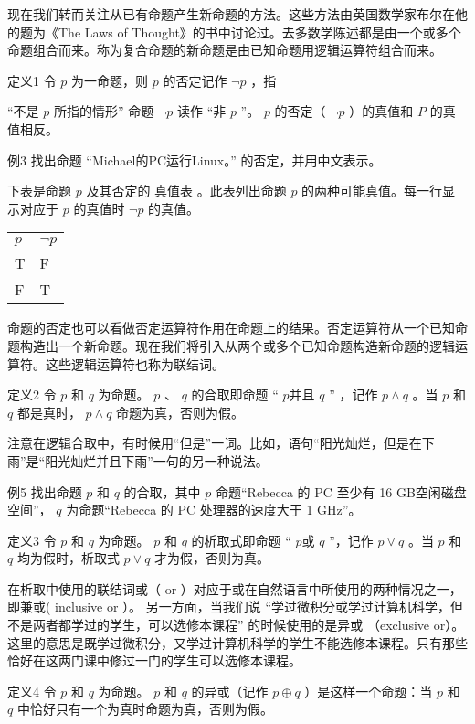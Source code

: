 现在我们转而关注从已有命题产生新命题的方法。这些方法由英国数学家布尔在他的题为《The Laws of Thought》的书中讨论过。去多数学陈述都是由一个或多个命题组合而来。称为复合命题的新命题是由已知命题用逻辑运算符组合而来。  

定义1  令
$p$
为一命题，则
$p$
的否定记作
$\neg p$
，指

	“不是
	$p$
	所指的情形”
命题
$\neg p$
读作 “非
$p$
”。
$p$
的否定（ 
$\neg p$
）的真值和
$P$
的真值相反。  

例3  找出命题
“Michael的PC运行Linux。” 
的否定，并用中文表示。

下表是命题
$p$
及其否定的 真值表 。此表列出命题
$p$
的两种可能真值。每一行显示对应于
$p$
的真值时
$\neg p$
的真值。  

\begin{table}[h]
	\centering
	\begin{tabular}{l|l}
		\hline
		$p$ & $\neg p$ \\
		\hline
		T & F	\\
		F & T \\
		\hline
	\end{tabular}
\end{table}
		

命题的否定也可以看做否定运算符作用在命题上的结果。否定运算符从一个已知命题构造出一个新命题。现在我们将引入从两个或多个已知命题构造新命题的逻辑运算符。这些逻辑运算符也称为联结词。

定义2  令
$p$
和
$q$
为命题。
$p$
、
$q$
的合取即命题 “
$p$并且
$q$
” ，记作 
$p \land q$ 
。当
$p$
和
$q$
都是真时，
$p \land q$
命题为真，否则为假。  

注意在逻辑合取中，有时候用“但是”一词。比如，语句“阳光灿烂，但是在下雨”是“阳光灿烂并且下雨”一句的另一种说法。  

例5  找出命题
$p$
和
$q$
的合取，其中
$p$
命题“Rebecca 的 PC 至少有 16 GB空闲磁盘空间”，
$q$
为命题“Rebecca 的 PC 处理器的速度大于 1 GHz”。  

定义3  令
$p$
和
$q$
为命题。
$p$
和
$q$
的析取式即命题 “
$p$或
$q$
”，记作
$p \lor q$
。当
$p$
和
$q$
均为假时，析取式
$p\lor q$
才为假，否则为真。  

在析取中使用的联结词或（ or ）对应于或在自然语言中所使用的两种情况之一，即兼或( inclusive or ）。  
另一方面，当我们说
 “学过微积分或学过计算机科学，但不是两者都学过的学生，可以选修本课程”
的时候使用的是异或 （exclusive or）。这里的意思是既学过微积分，又学过计算机科学的学生不能选修本课程。只有那些恰好在这两门课中修过一门的学生可以选修本课程。

定义4  令
$p$
和
$q$
为命题。
$p$
和
$q$
的异或（记作
$p \oplus q$
）是这样一个命题：当
$p$
和
$q$
中恰好只有一个为真时命题为真，否则为假。

